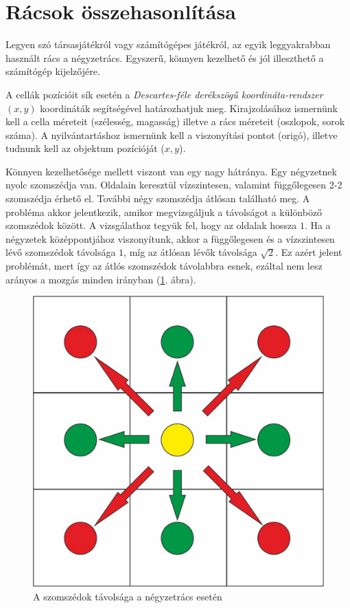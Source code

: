 

\section{Rácsok összehasonlítása}

Legyen szó társasjátékról vagy számítógépes játékról, az egyik leggyakrabban használt rács a négyzetrács. Egyszerű, könnyen kezelhető és jól illeszthető a számítógép kijelzőjére.

A cellák pozícióit sík esetén a \textit{Descartes-féle derékszögű koordináta-rendszer} $(x, y)$ koordináták segítségével határozhatjuk meg.
Kirajzolásához ismernünk kell a cella méreteit (szélesség, magasság) illetve a rács méreteit (oszlopok, sorok száma). 
A nyilvántartáshoz ismernünk kell a viszonyítási pontot (origó), illetve tudnunk kell az objektum pozícióját ($x, y$).

Könnyen kezelhetősége mellett viszont van egy nagy hátránya. Egy négyzetnek nyolc szomszédja van. Oldalain keresztül vízszintesen, valamint függőlegesen 2-2 szomszédja érhető el. További négy szomszédja átlósan található meg. A probléma akkor jelentkezik, amikor megvizsgáljuk a távolságot a különböző szomszédok között. A vizsgálathoz tegyük fel, hogy az oldalak hossza $1$. Ha a négyzetek középpontjához viszonyítunk, akkor a függőlegesen és a vízszintesen lévő szomszédok távolsága $1$, míg az átlósan lévők távolsága $\sqrt{2}$. Ez azért jelent problémát, mert így az átlós szomszédok távolabbra esnek, ezáltal nem lesz arányos a mozgás minden irányban (\ref{fig:SqDistance}. ábra).

\begin{figure}[h!]
\centering
\includegraphics[scale=0.4]{kepek/SqDistance.jpg}
\caption{A szomszédok távolsága a négyzetrács esetén}
\label{fig:SqDistance}
\end{figure}

